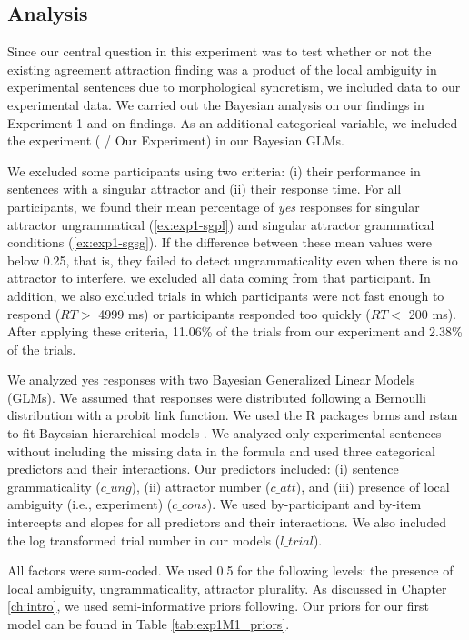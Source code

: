 \subsection{Analysis}

Since our central question in this experiment was to test whether or not the existing agreement attraction finding was a product of the local ambiguity in \cites{LagoEtAl2019} experimental sentences due to morphological syncretism, we included \cites{LagoEtAl2019} data to our experimental data. We carried out the Bayesian analysis on our findings in Experiment 1 and on \cites{LagoEtAl2019} findings. As an additional categorical variable, we included the experiment ( / Our Experiment) in our Bayesian GLMs.

We excluded some participants using two criteria: (i) their performance in sentences with a singular attractor and (ii) their response time. For all participants, we found their mean percentage of \textit{yes} responses for singular attractor ungrammatical (\ref{ex:exp1-sgpl}) and singular attractor grammatical conditions (\ref{ex:exp1-sgsg}). If the difference between these mean values were below 0.25, that is, they failed to detect ungrammaticality even when there is no attractor to interfere, we excluded all data coming from that participant. In addition, we also excluded trials in which participants were not fast enough to respond ($RT > $ 4999 ms) or participants responded too quickly ($RT < $ 200 ms). After applying these criteria, 11.06\% of the trials from our experiment and 2.38\% of the \cites{LagoEtAl2019} trials. 

We analyzed yes responses with two Bayesian Generalized Linear Models (GLMs). We assumed that responses were distributed following a Bernoulli distribution with a probit link function. We used the R packages brms \citep{R-brms_a,R-brms_b} and rstan \citep{R-rstan} to fit Bayesian hierarchical models \citep[e.g.,][]{GelmanHill:2007, NicenboimVasishth:2016}. We analyzed only experimental sentences without including the missing data in the formula and used three categorical predictors and their interactions. Our predictors included: (i) sentence grammaticality ($c\_ung$), (ii) attractor number ($c\_att$), and (iii) presence of local ambiguity (i.e., experiment) ($c\_cons$). We used by-participant and by-item intercepts and slopes for all predictors and their interactions. We also included the log transformed trial number in our models ($l\_trial$). 

All factors were sum-coded. We used 0.5 for the following levels: the presence of local ambiguity, ungrammaticality, attractor plurality. As discussed in Chapter \ref{ch:intro}, we used semi-informative priors following. Our priors for our first model can be found in Table \ref{tab:exp1M1_priors}.

